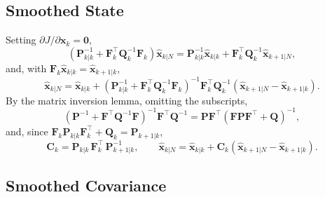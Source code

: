 \subsection*{Smoothed State}

Setting $\partial J/\partial \mathbf{x}_k = \mathbf{0}$,
\begin{equation}
    \left(\mathbf{P}_{k|k}^{-1} + \mathbf{F}_k^\top\mathbf{Q}_k^{-1}\mathbf{F}_k\right)
    \hat{\mathbf{x}}_{k|N}
    = \mathbf{P}_{k|k}^{-1}\hat{\mathbf{x}}_{k|k} + \mathbf{F}_k^\top\mathbf{Q}_k^{-1}\hat{\mathbf{x}}_{k+1|N},
\end{equation}
and, with $\mathbf{F}_k\hat{\mathbf{x}}_{k|k} = \hat{\mathbf{x}}_{k+1|k}$,
\begin{equation}
    \hat{\mathbf{x}}_{k|N} = \hat{\mathbf{x}}_{k|k}
    + \left(\mathbf{P}_{k|k}^{-1} + \mathbf{F}_k^\top\mathbf{Q}_k^{-1}\mathbf{F}_k\right)^{-1}
    \mathbf{F}_k^\top\mathbf{Q}_k^{-1}\left(\hat{\mathbf{x}}_{k+1|N} - \hat{\mathbf{x}}_{k+1|k}\right).
    \label{eq:app_rts_info}
\end{equation}
By the matrix inversion lemma, omitting the subscripts,
\begin{equation}
    \left(\mathbf{P}^{-1} + \mathbf{F}^\top\mathbf{Q}^{-1}\mathbf{F}\right)^{-1}\mathbf{F}^\top\mathbf{Q}^{-1}
    = \mathbf{P}\mathbf{F}^\top\left(\mathbf{F}\mathbf{P}\mathbf{F}^\top + \mathbf{Q}\right)^{-1},
\end{equation}
and, since $\mathbf{F}_k\mathbf{P}_{k|k}\mathbf{F}_k^\top + \mathbf{Q}_k = \mathbf{P}_{k+1|k}$,
\begin{equation}
    \mathbf{C}_k = \mathbf{P}_{k|k}\,\mathbf{F}_k^\top\,\mathbf{P}_{k+1|k}^{-1},
    \qquad
    \hat{\mathbf{x}}_{k|N} = \hat{\mathbf{x}}_{k|k}
    + \mathbf{C}_k\left(\hat{\mathbf{x}}_{k+1|N} - \hat{\mathbf{x}}_{k+1|k}\right).
    \label{eq:app_rts_state}
\end{equation}

\subsection*{Smoothed Covariance}

